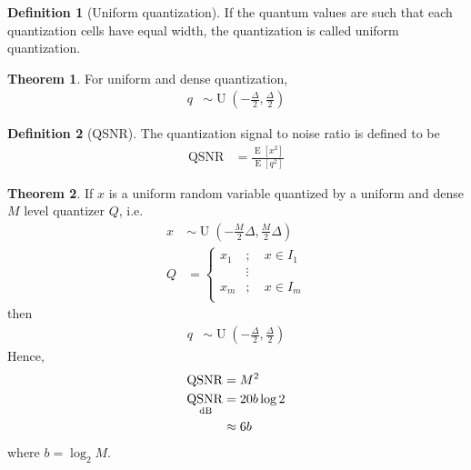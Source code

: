 \documentclass[titlepage, fleqn, a4paper, 12pt, twoside]{article}
\theoremstyle{definition}
\newtheorem{definition}{Definition}
\theoremstyle{theorem}
\newtheorem{theorem}{Theorem}
\DeclareMathOperator{\expct}{\mathrm{E}}
\DeclareMathOperator{\uniform}{\mathrm{U}}
\DeclareMathOperator{\QSNR}{\mathrm{QSNR}}
\begin{document}
\begin{definition}[Uniform quantization]
	If the quantum values are such that each quantization cells have equal width, the quantization is called uniform quantization.
\end{definition}

\begin{theorem}
	For uniform and dense quantization,
	\begin{align*}
		q &\sim \uniform\left( -\frac{\Delta}{2},\frac{\Delta}{2} \right)
	\end{align*}
\end{theorem}

\begin{definition}[QSNR]
	The quantization signal to noise ratio is defined to be
	\begin{align*}
		\QSNR &= \frac{\expct\left[ x^2 \right]}{\expct\left[ q^2 \right]}
	\end{align*}
\end{definition}

\begin{theorem}
	If $x$ is a uniform random variable quantized by a uniform and dense $M$ level quantizer $Q$, i.e.
	\begin{align*}
		x &\sim \uniform\left( -\frac{M}{2} \Delta,\frac{M}{2} \Delta \right)\\
		Q &=
			\begin{cases}
				x_1 &;\quad x \in I_1\\
				&\vdots\\
				x_m &;\quad x \in I_m\\
			\end{cases}
	\end{align*}
	then
	\begin{align*}
		q &\sim \uniform\left( -\frac{\Delta}{2},\frac{\Delta}{2} \right)
	\end{align*}
	Hence,
	\begin{align*}
		\QSNR &= M^2\\
		\QSNR_{\decibel} &= 20 b \log 2\\
		&\approx 6 b
	\end{align*}
	where $b = \log_2 M$.
\end{theorem}
\end{document}
